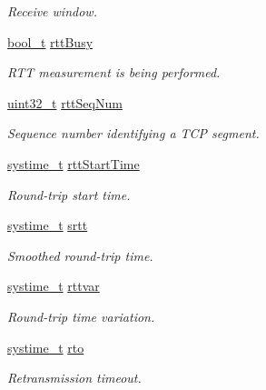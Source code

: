 \begin{DoxyCompactItemize}
\begin{DoxyCompactList}\small\item\em Receive window. \end{DoxyCompactList}\item 
\hyperlink{compiler__port_8h_a812d16e5494522586b3784e55d479912}{bool\+\_\+t} \hyperlink{struct__Socket_a2ee8d1d7d2c17888f9b87ca8646cb4bb}{rtt\+Busy}
\begin{DoxyCompactList}\small\item\em R\+TT measurement is being performed. \end{DoxyCompactList}\item 
\hyperlink{stdint_8h_a435d1572bf3f880d55459d9805097f62}{uint32\+\_\+t} \hyperlink{struct__Socket_ad8aba43068f28bc601d677e04a9d6995}{rtt\+Seq\+Num}
\begin{DoxyCompactList}\small\item\em Sequence number identifying a T\+CP segment. \end{DoxyCompactList}\item 
\hyperlink{compiler__port_8h_ae3e32a98d431a02106616da3071832dd}{systime\+\_\+t} \hyperlink{struct__Socket_a061c165f4f0faf864a177f074078caf5}{rtt\+Start\+Time}
\begin{DoxyCompactList}\small\item\em Round-\/trip start time. \end{DoxyCompactList}\item 
\hyperlink{compiler__port_8h_ae3e32a98d431a02106616da3071832dd}{systime\+\_\+t} \hyperlink{struct__Socket_ae2be6dc034b284b76490589bb9d7aba3}{srtt}
\begin{DoxyCompactList}\small\item\em Smoothed round-\/trip time. \end{DoxyCompactList}\item 
\hyperlink{compiler__port_8h_ae3e32a98d431a02106616da3071832dd}{systime\+\_\+t} \hyperlink{struct__Socket_a5c886d6854b06dadf539a115107a39a0}{rttvar}
\begin{DoxyCompactList}\small\item\em Round-\/trip time variation. \end{DoxyCompactList}\item 
\hyperlink{compiler__port_8h_ae3e32a98d431a02106616da3071832dd}{systime\+\_\+t} \hyperlink{struct__Socket_adce7f8cd17fecf3025e8333b0110397b}{rto}
\begin{DoxyCompactList}\small\item\em Retransmission timeout. \end{DoxyCompactList}\item 

\end{DoxyCompactItemize}
